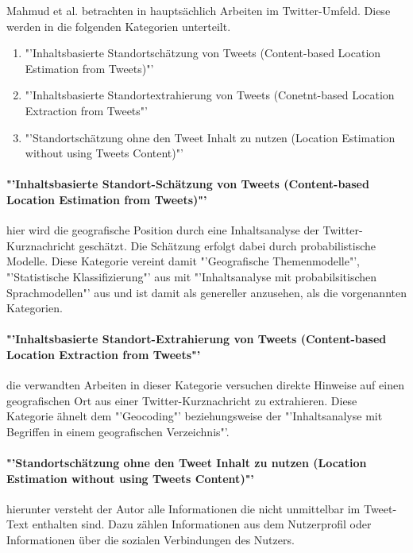 		Mahmud et al. betrachten in \cite{Mahmud2012} hauptsächlich Arbeiten im Twitter-Umfeld. 
		Diese werden in die folgenden Kategorien unterteilt. 

		\begin{enumerate}
			\item  "'Inhaltsbasierte Standortschätzung von Tweets (Content-based Location Estimation from Tweets)"'
			\item "'Inhaltsbasierte Standortextrahierung von Tweets (Conetnt-based Location Extraction from Tweets"'
			\item "'Standortschätzung ohne den Tweet Inhalt zu nutzen (Location Estimation without using Tweets Content)"'
		\end{enumerate}

		\paragraph*{"'Inhaltsbasierte Standort-Schätzung von Tweets (Content-based Location Estimation from Tweets)"'} hier wird die geografische Position durch eine Inhaltsanalyse der Twitter-Kurznachricht geschätzt. 
		Die Schätzung erfolgt dabei durch probabilistische Modelle.
		Diese Kategorie vereint damit "'Geografische Themenmodelle"', "'Statistische Klassifizierung"' aus \cite{Priedhorsky2013} mit "'Inhaltsanalyse mit probabilsitischen Sprachmodellen"' aus \cite{Cheng2010} und ist damit als genereller anzusehen, als die vorgenannten Kategorien. 

		\paragraph*{"'Inhaltsbasierte Standort-Extrahierung von Tweets (Content-based Location Extraction from Tweets"'} die verwandten Arbeiten in dieser Kategorie versuchen direkte Hinweise auf einen geografischen Ort aus einer Twitter-Kurznachricht zu extrahieren. 
		Diese Kategorie ähnelt dem "'Geocoding"' beziehungsweise der "'Inhaltsanalyse mit Begriffen in einem geografischen Verzeichnis"'. 

		\paragraph*{"'Standortschätzung ohne den Tweet Inhalt zu nutzen (Location Estimation without using Tweets Content)"'} hierunter versteht der Autor alle Informationen die nicht unmittelbar im Tweet-Text enthalten sind. Dazu zählen Informationen aus dem Nutzerprofil oder Informationen über die sozialen Verbindungen des Nutzers.


